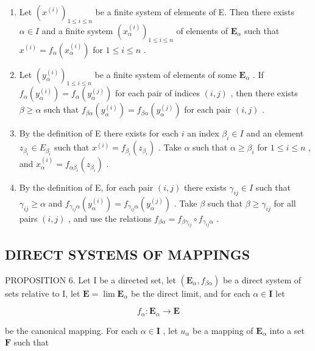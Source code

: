 \begin{enumerate}
\def\labelenumi{(\roman{enumi})}
\item
  Let \((x^{(i)})_{1\leqslant i\leqslant n}\) be a finite system of elements of E. Then there exists \(\alpha \in I\) and a finite system \((x_{\alpha}^{(i)})_{1\leqslant i\leqslant n}\) of elements of \(\mathbf{E}_{\alpha}\) such that \(x^{(i)} = f_{\alpha}(x_{\alpha}^{(i)})\) for \(1\leqslant i\leqslant n\) .
\item
  Let \((y_{\alpha}^{(i)})_{1\leqslant i\leqslant n}\) be a finite system of elements of some \(\mathbf{E}_{\alpha}\) . If \(f_{\alpha}(y_{\alpha}^{(i)}) = f_{\alpha}(y_{\alpha}^{(j)})\) for each pair of indices \((i,j)\) , then there exists \(\beta \geqslant \alpha\) such that \(f_{\beta \alpha}(y_{\alpha}^{(i)}) = f_{\beta \alpha}(y_{\alpha}^{(j)})\) for each pair \((i,j)\) .
\item
  By the definition of E there exists for each \(i\) an index \(\beta_{i} \in I\) and an element \(z_{\beta_{i}} \in E_{\beta_{i}}\) such that \(x^{(i)} = f_{\beta_{i}}(z_{\beta_{i}})\) . Take \(\alpha\) such that \(\alpha \geqslant \beta_{i}\) for \(1 \leqslant i \leqslant n\) , and \(x_{\alpha}^{(i)} = f_{\alpha \beta_{i}}(z_{\beta_{i}})\) .
\item
  By the definition of E, for each pair \((i, j)\) there exists \(\gamma_{ij} \in I\) such that \(\gamma_{ij} \geqslant \alpha\) and \(f_{\gamma_{ij}\alpha}(y_{\alpha}^{(i)}) = f_{\gamma_{ij}\alpha}(y_{\alpha}^{(j)})\) . Take \(\beta\) such that \(\beta \geqslant \gamma_{ij}\) for all pairs \((i, j)\) , and use the relations \(f_{\beta\alpha} = f_{\beta\gamma_{ij}} \circ f_{\gamma_{ij}\alpha}\) .
\end{enumerate}

\subsection{DIRECT SYSTEMS OF MAPPINGS}

PROPOSITION 6. Let I be a directed set, let \((\mathbf{E}_{\alpha}, f_{\beta \alpha})\) be a direct system of sets relative to I, let \(\mathbf{E} = \lim \mathbf{E}_{\alpha}\) be the direct limit, and for each \(\alpha \in \mathbf{I}\) let

\[
f _ {\alpha}: \mathbf {E} _ {\alpha} \rightarrow \mathbf {E}
\]

be the canonical mapping. For each \(\alpha \in \mathbf{I}\) , let \(u_{\alpha}\) be a mapping of \(\mathbf{E}_{\alpha}\) into a set \(\mathbf{F}\) such that


